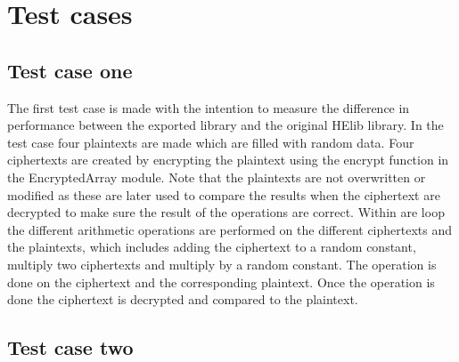 \section{Test cases}

\subsection{Test case one}
The first test case is made with the intention to measure the difference in performance between the exported library and the original HElib library. In the test case four plaintexts are made which are filled with random data. Four ciphertexts are created by encrypting the plaintext using the encrypt function in the EncryptedArray module.  Note that the plaintexts are not overwritten or modified as these are later used to compare the results when the ciphertext are decrypted to make sure the result of the operations are correct. Within are loop the different arithmetic operations are performed on the different ciphertexts and the plaintexts, which includes adding the ciphertext to a random constant, multiply two ciphertexts and multiply by a random constant. The operation is done on the ciphertext and the corresponding plaintext. Once the operation is done the ciphertext is decrypted and compared to the plaintext.

\newpage
\subsection{Test case two}

